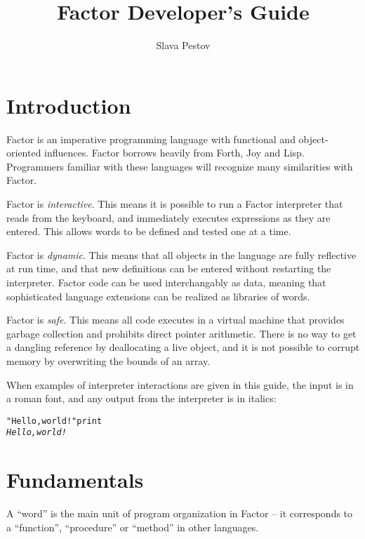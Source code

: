 \documentclass[english]{article}
\begin{document}
\title{Factor Developer's Guide}


\author{Slava Pestov}

\maketitle
\tableofcontents{}


\newpage
\section*{Introduction}

Factor is an imperative programming language with functional and object-oriented
influences. Factor borrows heavily from Forth, Joy and Lisp. Programmers familiar with these languages will recognize many similarities with Factor.

Factor is \emph{interactive}. This means it is possible to run a Factor interpreter that reads from the keyboard, and immediately executes expressions as they are entered. This allows words to be defined and tested one at a time.

Factor is \emph{dynamic}. This means that all objects in the language are fully reflective at run time, and that new definitions can be entered without restarting the interpreter. Factor code can be used interchangably as data, meaning that sophisticated language extensions can be realized as libraries of words.

Factor is \emph{safe}. This means all code executes in a virtual machine that provides
garbage collection and prohibits direct pointer arithmetic. There is no way to get a dangling reference by deallocating a live object, and it is not possible to corrupt memory by overwriting the bounds of an array.

When examples of interpreter interactions are given in this guide, the input is in a roman font, and any
output from the interpreter is in italics:

\begin{alltt}
"Hello, world!" print
\emph{Hello, world!}
\end{alltt}

\section{Fundamentals}

A ``word'' is the main unit of program organization
in Factor -- it corresponds to a ``function'', ``procedure''
or ``method'' in other languages.
\end{document}
